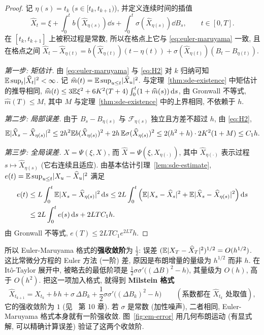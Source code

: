 \begin{proof}
记 $\eta(s)=t_k$ ($s\in[t_k,t_{k+1})$), 并定义连续时间的插值
\[
\widehat{X}_t=\xi+\int_0^tb(\widehat{X}_{\eta(s)})\dd s+\int_0^t\sigma(\widehat{X}_{\eta(s)})\dd B_s,\qquad t\in[0,T].
\]
在 $[t_k,t_{k+1}]$ 上被积过程是常数, 所以在格点上它与 \eqref{eq:euler-maruyama} 一致, 且在格点之间 $\widehat{X}_t-\widehat{X}_{\eta(t)}=b(\widehat{X}_{\eta(t)})(t-\eta(t))+\sigma(\widehat{X}_{\eta(t)})(B_t-B_{\eta(t)})$.

\emph{第一步: 矩估计.} 由 \eqref{eq:euler-maruyama} 与 \eqref{eq:H2} 对 $k$ 归纳可知 $\mathbb{E}\sup_t\lvert\widehat{X}_t\rvert^2<\infty$. 记 $\widehat{m}(t)=\mathbb{E}\sup_{u\le t}\lvert\widehat{X}_u\rvert^2$. 与定理~\ref{thm:sde-existence} 中矩估计的推导相同, $\widehat{m}(t)\le3\mathbb{E}\xi^2+6K^2(T+4)\int_0^t(1+\widehat{m}(s))\mathop{}\!\mathrm{d} s$, 由 Gronwall 不等式, $\widehat{m}(T)\le M$, 其中 $M$ 与定理~\ref{thm:sde-existence} 中的上界相同, 不依赖于 $h$.

\emph{第二步: 局部误差.} 由于 $B_s-B_{\eta(s)}$ 与 $\mathcal{F}_{\eta(s)}$ 独立且方差不超过 $h$, 由 \eqref{eq:H2},
\[
\mathbb{E}\lvert\widehat{X}_s-\widehat{X}_{\eta(s)}\rvert^2\le2h^2\mathbb{E} b(\widehat{X}_{\eta(s)})^2+2h\,\mathbb{E}\sigma(\widehat{X}_{\eta(s)})^2\le2(h^2+h)\cdot2K^2(1+M)\le C_1h.
\]

\emph{第三步: 全局误差.} $X=\Psi(\xi,X)$, 而 $\widehat{X}=\Psi(\xi,\widehat{X}_{\eta(\cdot)})$, 其中 $\widehat{X}_{\eta(\cdot)}$ 表示过程 $s\mapsto\widehat{X}_{\eta(s)}$ (它右连续且适应). 由基本估计引理~\ref{lem:sde-estimate}, $e(t)=\mathbb{E}\sup_{u\le t}\lvert X_u-\widehat{X}_u\rvert^2$ 满足
\begin{align*}
e(t)&\le L\int_0^t\mathbb{E}\lvert X_s-\widehat{X}_{\eta(s)}\rvert^2\mathop{}\!\mathrm{d} s\le2L\int_0^t\Big(\mathbb{E}\lvert X_s-\widehat{X}_s\rvert^2+\mathbb{E}\lvert\widehat{X}_s-\widehat{X}_{\eta(s)}\rvert^2\Big)\mathop{}\!\mathrm{d} s\\
&\le2L\int_0^te(s)\mathop{}\!\mathrm{d} s+2LTC_1h.
\end{align*}
由 Gronwall 不等式, $e(T)\le2LTC_1e^{2LT}h$.
\end{proof}

所以 Euler-Maruyama 格式的\textbf{强收敛阶}为 $\frac{1}{2}$: 误差 $(\mathbb{E}\lvert X_T-\widehat{X}_T\rvert^2)^{1/2}=O(h^{1/2})$. 这比常微分方程的 Euler 方法 (一阶) 差, 原因是布朗增量的量级为 $h^{1/2}$ 而非 $h$. 在 It\^o-Taylor 展开中, 被略去的最低阶项是 $\frac{1}{2}\sigma\sigma'\big((\Delta B)^2-h\big)$, 其量级为 $O(h)$, 高于 $O(h^2)$. 把这一项加入格式, 就得到 \textbf{Milstein 格式}
\[
\widehat{X}_{t_{k+1}}=\widehat{X}_{t_k}+b\,h+\sigma\,\Delta B_k+\frac{1}{2}\sigma\sigma'\big((\Delta B_k)^2-h\big)\qquad(\text{系数都在 }\widehat{X}_{t_k}\text{ 处取值}),
\]
它的强收敛阶为 $1$ (见~\cite{kloeden} 第 10 章). 若 $\sigma$ 是常数 (加性噪声), 二者相同, Euler-Maruyama 格式本身就有一阶强收敛. 图~\ref{fig:em-error} 用几何布朗运动 (有显式解, 可以精确计算误差) 验证了这两个收敛阶.

